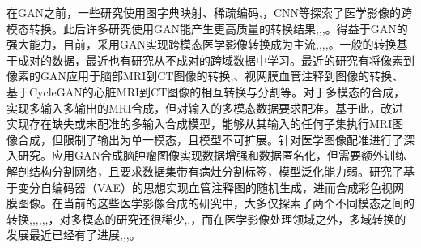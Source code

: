 \documentclass[letterpaper]{article} %
\begin{document}
在GAN之前，一些研究使用图字典映射\cite{22burgos2015robust}、稀疏编码\cite{33huang2017simultaneous},\cite{34vemulapalli2015unsupervised}，CNN\cite{36vannguyen2015crossdomain}等探索了医学影像的跨模态转换。此后许多研究使用GAN能产生更高质量的转换结果\cite{1zhao2018modular},\cite{5liang2018generative},\cite{6zhu2017unpaired},\cite{13choi2018stargan:}。得益于GAN的强大能力，目前，采用GAN实现跨模态医学影像转换成为主流\cite{2zhang2018translating},\cite{20nie2017medical},\cite{35osokin2017gans},\cite{36vannguyen2015crossdomain},\cite{40kamnitsas2017unsupervised}。一般的转换基于成对的数据，最近也有研究从不成对的跨域数据中学习\cite{2zhang2018translating}。最近的研究有将像素到像素的GAN应用于脑部MRI到CT图像的转换\cite{20nie2017medical},\cite{40kamnitsas2017unsupervised}、视网膜血管注释到图像的转换\cite{41costa2017towards}、基于CycleGAN\cite{6zhu2017unpaired}的心脏MRI到CT图像的相互转换与分割\cite{20nie2017medical}等。对于多模态的合成，\cite{84chartsias2018multimodal}实现多输入多输出的MRI合成，但对输入的多模态数据要求配准。基于此，\cite{85joyce2017robust}改进实现存在缺失或未配准的多输入合成模型，能够从其输入的任何子集执行MRI图像合成，但限制了输出为单一模态，且模型不可扩展。\cite{66miao2018dilated}针对医学图像配准进行了深入研究。\cite{4shin2018medical}应用GAN合成脑肿瘤图像实现数据增强和数据匿名化，但需要额外训练解剖结构分割网络，且要求数据集带有病灶分割标签，模型泛化能力弱。\cite{41costa2017towards}研究了基于变分自编码器（VAE）的思想实现血管注释图的随机生成，进而合成彩色视网膜图像。在当前的这些医学影像合成的研究中，大多仅探索了两个不同模态之间的转换\cite{2zhang2018translating},\cite{20nie2017medical},\cite{22burgos2015robust},\cite{34vemulapalli2015unsupervised},\cite{35osokin2017gans},\cite{36vannguyen2015crossdomain},\cite{40kamnitsas2017unsupervised}，对多模态的研究还很稀少\cite{84chartsias2018multimodal},\cite{85joyce2017robust},\cite{4shin2018medical}，而在医学影像处理领域之外，多域转换的发展最近已经有了进展\cite{1zhao2018modular},\cite{5liang2018generative},\cite{13choi2018stargan:},\cite{27isola2017image-to-image}。
\end{document}

